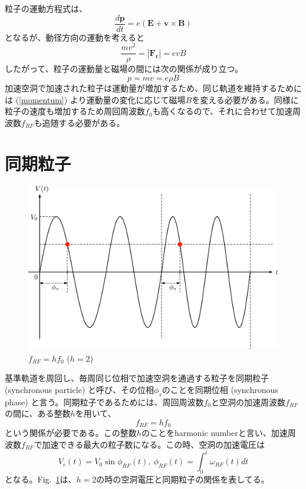\documentclass[10pt,a4paper]{ltjsarticle}
\begin{document}
粒子の運動方程式は、
%
\begin{equation}
  \frac{d\bm{p}}{dt} = e (\bm{E} + \bm{v}\times \bm{B})
\end{equation}
%
となるが、動径方向の運動を考えると
%
\begin{equation}
  \frac{m v^2}{\rho} = |\bm{F_r}| = e v B
\end{equation}
%
したがって、粒子の運動量と磁場の間には次の関係が成り立つ。
%
\begin{equation}
  p = mv = e \rho B
  \label{momentum}
\end{equation}
%
加速空洞で加速された粒子は運動量が増加するため、同じ軌道を維持するためには (\ref{momentum}) より運動量の変化に応じて磁場$B$を変える必要がある。同様に粒子の速度も増加するため周回周波数$f_0$も高くなるので、それに合わせて加速周波数$f_{RF}$も追随する必要がある。
%
\section{同期粒子}
\begin{figure}[hbt]
  \begin{center}
    \includegraphics[width=15cm,clip]{synchronous.pdf}
    \caption{$f_{RF} = h f_0$ ($h=2$)}
    \label{synchronous}
  \end{center}
\end{figure}

基準軌道を周回し、毎周同じ位相で加速空洞を通過する粒子を同期粒子 (synchronous particle) と呼び、その位相$\phi_s$のことを同期位相 (synchronous phase) と言う。同期粒子であるためには、周回周波数$f_0$と空洞の加速周波数$f_{RF}$の間に、ある整数$h$を用いて、
%
\begin{equation}
  f_{RF} = h f_0
  \label{harmonic}
\end{equation}
%
という関係が必要である。この整数$h$のことをharmonic numberと言い、加速周波数$f_{RF}$で加速できる最大の粒子数になる。この時、空洞の加速電圧は
%
\begin{equation}
  V_c (t) = V_0 \sin \phi_{RF}(t),\:\phi_{RF}(t) = \int_0^t \omega_{RF}(t) dt
\end{equation}
%
となる。Fig.~\ref{synchronous}は、$h=2$の時の空洞電圧と同期粒子の関係を表してる。
\end{document}
